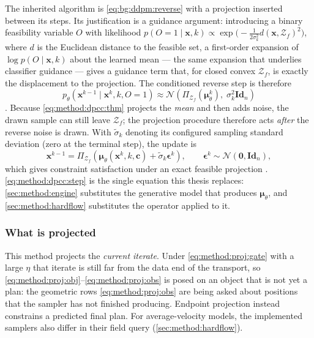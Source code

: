 \documentclass[headsepline,footsepline,footinclude=false,oneside,fontsize=11pt,paper=a4,listof=totoc,bibliography=totoc]{scrbook}
\theoremstyle{definition}
\theoremstyle{plain}
\theoremstyle{remark}
\newcommand{\vect}[1]{\boldsymbol{#1}}
\newcommand{\Id}[1]{\textbf{Id}_{#1}}
\newcommand{\Normal}{\mathcal{N}}              %
\newcommand{\proj}[1]{\Pi_{#1}}                %
\begin{document}
The inherited algorithm is \eqref{eq:bg:ddpm:reverse} with a projection inserted between its
steps. Its justification is a guidance argument: introducing a binary feasibility variable
$O$ with likelihood
$p(O{=}1\mid\vect{x},k) \propto \exp\!\big(-\tfrac{1}{2\sigma_{k}^{2}}d(\vect{x},\mathcal{Z}_{f})^{2}\big)$,
where $d$ is the Euclidean distance to the feasible set, a first-order expansion of
$\log p(O\mid\vect{x},k)$ about the learned mean --- the same expansion that underlies classifier
guidance \parencite{dhariwal2021diffusion} --- gives a guidance term that, for closed convex
$\mathcal{Z}_{f}$, is exactly the displacement to the projection. The conditioned reverse step
is therefore
\begin{equation}\label{eq:method:dpcc:thm}
  p_{\theta}\!\left(\vect{x}^{k-1}\mid\vect{x}^{k},k,O{=}1\right)
  \approx \Normal\!\left(\proj{\mathcal{Z}_{f}}\!\left(\vect{\mu}_{\theta}^{k}\right),\;
    \sigma_{k}^{2}\Id{n}\right)
\end{equation}
\parencite[Theorem~1]{romer2025diffusion}. Because \eqref{eq:method:dpcc:thm} projects the
\emph{mean} and then adds noise, the drawn sample can still leave $\mathcal{Z}_{f}$; the
projection procedure therefore acts \emph{after} the reverse noise is drawn. With
$\tilde{\sigma}_k$ denoting its configured sampling standard deviation (zero at the terminal step),
the update is
\begin{equation}\label{eq:method:dpcc:step}
  \vect{x}^{k-1}
  = \proj{\mathcal{Z}_{f}}\!\left(
      \vect{\mu}_{\theta}\!\left(\vect{x}^{k},k,\vect{c}\right) + \tilde{\sigma}_{k}\vect{\epsilon}^{k}
    \right),
  \qquad \vect{\epsilon}^{k}\sim\Normal(\vect{0},\Id{n}),
\end{equation}
which gives constraint satisfaction under an exact feasible projection
\parencite[Eq.~16]{romer2025diffusion}. \eqref{eq:method:dpcc:step} is the single equation this
thesis replaces: \autoref{sec:method:engine} substitutes the generative model that produces
$\vect{\mu}_{\theta}$, and \autoref{sec:method:hardflow} substitutes the operator applied to it.

\subsubsection*{What is projected}

This method projects the \emph{current iterate}. Under \eqref{eq:method:proj:gate} with a large $\eta$
that iterate is still far from the data end of the transport, so
\eqref{eq:method:proj:obj}--\eqref{eq:method:proj:obs} is posed on an object that is not yet a
plan: the geometric rows \eqref{eq:method:proj:obs} are being asked about positions that the
sampler has not finished producing. Endpoint projection instead constrains a predicted final plan. For average-velocity models, the
implemented samplers also differ in their field query (\autoref{sec:method:hardflow}).
\end{document}
